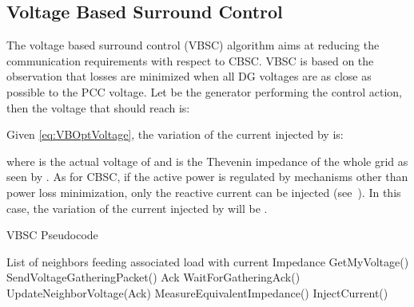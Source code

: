 \documentclass[journal]{IEEEtran}
\begin{document}
\subsection{Voltage Based Surround Control}
\label{ssec:VBControl}

The voltage based surround control (VBSC) algorithm \cite{SurroundControl} aims at reducing the communication requirements with respect to CBSC. VBSC is based on the observation that losses are minimized when all DG voltages are as close as possible to the PCC voltage. Let  be the generator performing the control action, then the voltage that  should reach is:

Given \eqref{eq:VBOptVoltage}, the variation of the current injected by  is:

where  is the actual voltage of  and  is the Thevenin impedance of the whole grid as seen by . As for CBSC, if the active power is regulated by mechanisms other than power loss minimization, only the reactive current can be injected (see~\cite{SurroundControl}). In this case, the variation of the current injected by  will be .

\begin{algorithm}
\caption{VBSC Pseudocode}\label{algo:VBControlAlgo}
\begin{algorithmic}[1]
\REQUIRE List of neighbors 
\REQUIRE  feeding associated load with current 
\REQUIRE Impedance  
\STATE   GetMyVoltage() \label{line:GetVoltage}
\FORALL{}
\STATE SendVoltageGatheringPacket() \label{line:sendPkt}
\STATE Ack  WaitForGatheringAck() \label{line:rxAck}
\STATE   UpdateNeighborVoltage(Ack) \label{line:setNeighVoltage}
\STATE    \label{line:calcNum}
\STATE    \label{line:calcDen}
\ENDFOR
\STATE   MeasureEquivalentImpedance() \label{line:GetThImp}
\STATE    \label{line:compOptVoltage}
\STATE    \label{line:updateCur}
\STATE InjectCurrent() \label{line:injCur}
\end{algorithmic}
\end{algorithm}
\end{document}
